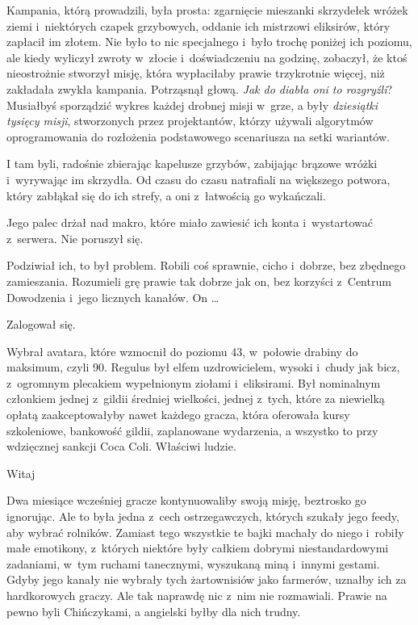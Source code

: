 \documentclass[oneside,polish,11pt,rmheadings]{mwbk}
\begin{document}
Kampania, którą prowadzili, była prosta: zgarnięcie mieszanki skrzydełek wróżek ziemi i~niektórych czapek grzybowych, oddanie ich mistrzowi eliksirów, który zapłacił im złotem. Nie było to nic specjalnego i~było trochę poniżej ich poziomu, ale kiedy wyliczył zwroty w~złocie i~doświadczeniu na godzinę, zobaczył, że ktoś nieostrożnie stworzył misję, która wypłaciłaby prawie trzykrotnie więcej, niż zakładała zwykła kampania. Potrząsnął głową. \textit{Jak do diabła oni to rozgryźli}? Musiałbyś sporządzić wykres każdej drobnej misji w~grze, a były \textit{dziesiątki tysięcy misji}, stworzonych przez projektantów, którzy używali algorytmów oprogramowania do rozłożenia podstawowego scenariusza na setki wariantów.

I tam byli, radośnie zbierając kapelusze grzybów, zabijając brązowe wróżki i~wyrywając im skrzydła. Od czasu do czasu natrafiali na większego potwora, który zabłąkał się do ich strefy, a oni z~łatwością go wykańczali.

Jego palec drżał nad makro, które miało zawiesić ich konta i~wystartować z~serwera. Nie poruszył się.

Podziwiał ich, to był problem. Robili coś sprawnie, cicho i~dobrze, bez zbędnego zamieszania. Rozumieli grę prawie tak dobrze jak on, bez korzyści z~Centrum Dowodzenia i~jego licznych kanałów. On  \ldots 

Zalogował się.

Wybrał avatara, które wzmocnił do poziomu 43, w~połowie drabiny do maksimum, czyli 90. Regulus był elfem uzdrowicielem, wysoki i~chudy jak bicz, z~ogromnym plecakiem wypełnionym ziołami i~eliksirami. Był nominalnym członkiem jednej z~gildii średniej wielkości, jednej z~tych, które za niewielką opłatą zaakceptowałyby nawet każdego gracza, która oferowała kursy szkoleniowe, bankowość gildii, zaplanowane wydarzenia, a wszystko to przy wdzięcznej sankcji Coca Coli. Właściwi ludzie.

\noindent {\textgreater} Witaj

Dwa miesiące wcześniej gracze kontynuowaliby swoją misję, beztrosko go ignorując. Ale to była jedna z~cech ostrzegawczych, których szukały jego feedy, aby wybrać rolników. Zamiast tego wszystkie te bajki machały do niego i~robiły małe emotikony, z~których niektóre były całkiem dobrymi niestandardowymi zadaniami, w~tym ruchami tanecznymi, wyszukaną miną i~innymi gestami. Gdyby jego kanały nie wybrały tych żartownisiów jako farmerów, uznałby ich za hardkorowych graczy. Ale tak naprawdę nic z~nim nie rozmawiali. Prawie na pewno byli Chińczykami, a angielski byłby dla nich trudny.
\end{document}
